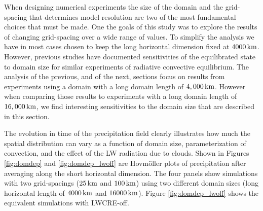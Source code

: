 \documentclass[draft]{agujournal2019}
\begin{document}
When designing numerical experiments the size of the domain and the grid-spacing that determines model resolution are 
two of the most fundamental choices that must be made.   One the goals of this study was to explore the results of 
changing grid-spacing over a wide range of values.  To simplify the analysis we have in most cases chosen to keep the 
long horizontal dimension fixed at $4000\, \rm{km}$.  However, previous studies 
\cite{Bretherton2005, Bretherton_etal_2006, Muller2012, Jeevanjee2013, Silvers2016, Patrizio2019}
have documented sensitivities of the equilibrated state to domain size for similar experiments
of radiative convective equilibrium.   
The analysis of the previous, and of the next, sections focus on results from 
experiments using a domain with a long domain length of $4,000 \, \rm{km}$.  However when comparing those results
to experiments with a long domain length of $16,000 \, \rm{km}$, we find interesting 
sensitivities to the domain size that are described in this section. 

The evolution in time of the precipitation field clearly illustrates how much the spatial distribution can vary as a 
function of domain size, parameterization of convection, and the effect of the LW radiation due to clouds. 
Shown in Figures {\ref{fig:domdep}} and {\ref{fig:domdep_lwoff}} are Hovm{\"o}ller plots of precipitation after 
averaging along the short horizontal dimension.  The four panels show simulations with two grid-spacings 
($25\, \rm{km}$ and $100\, \rm{km}$) using two different domain sizes (long horizontal length of $4000\, \rm{km}$ and $16000\, \rm{km}$).
Figure  {\ref{fig:domdep_lwoff}} shows the equivalent simulations with LWCRE-off.    
\end{document}
